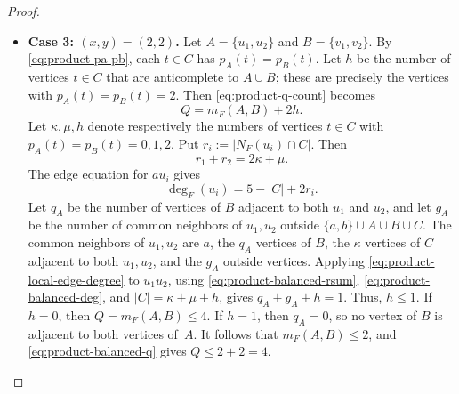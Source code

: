 \documentclass[10pt,a4paper]{amsart}
\begin{document}
\begin{proof}
\begin{itemize}
\item \textbf{Case 3: $(x,y)=(2,2)$.}
Let $A=\{u_1,u_2\}$ and $B=\{v_1,v_2\}$.
By \eqref{eq:product-pa-pb}, each $t\in C$ has $p_A(t)=p_B(t)$.
Let $h$ be the number of vertices $t\in C$ that are anticomplete to $A\cup B$; these are precisely the vertices with $p_A(t)=p_B(t)=2$.
Then \eqref{eq:product-q-count} becomes
\begin{equation}
\label{eq:product-balanced-q}
Q=m_F(A,B)+2h.
\end{equation}
Let $\kappa,\mu,h$ denote respectively the numbers of vertices $t\in C$ with $p_A(t)=p_B(t)=0,1,2$.
Put $r_i:=|N_F(u_i)\cap C|$.
Then
\begin{equation}
\label{eq:product-balanced-rsum}
r_1+r_2=2\kappa+\mu.
\end{equation}
The edge equation for $au_i$ gives
\begin{equation}
\label{eq:product-balanced-deg}
\deg_F(u_i)=5-|C|+2r_i.
\end{equation}
Let $q_A$ be the number of vertices of $B$ adjacent to both $u_1$ and $u_2$, and let $g_A$ be the number of common neighbors of $u_1,u_2$ outside $\{a,b\}\cup A\cup B\cup C$.
The common neighbors of $u_1,u_2$ are $a$, the $q_A$ vertices of $B$, the $\kappa$ vertices of $C$ adjacent to both $u_1,u_2$, and the $g_A$ outside vertices.
Applying \eqref{eq:product-local-edge-degree} to $u_1u_2$, using \eqref{eq:product-balanced-rsum}, \eqref{eq:product-balanced-deg}, and $|C|=\kappa+\mu+h$, gives $q_A+g_A+h=1$.
Thus, $h\le 1$.
If $h=0$, then $Q=m_F(A,B)\le 4$.
If $h=1$, then $q_A=0$, so no vertex of $B$ is adjacent to both vertices of~$A$.
It follows that $m_F(A,B)\le 2$, and \eqref{eq:product-balanced-q} gives $Q\le 2+2=4$.
\end{itemize}
\end{proof}
\end{document}
